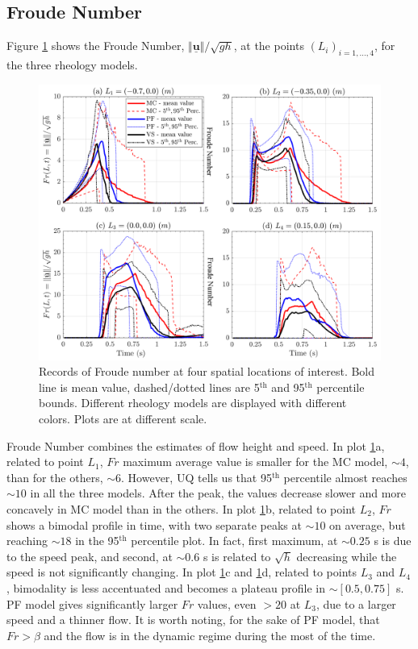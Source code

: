 \documentclass{article}
\begin{document}
\subsection{Froude Number}
Figure \ref{fig:Ramp-Fr} shows the Froude Number, $\Vert \underline{\mathbf{u}} \Vert/\sqrt{gh}$, at the points $(L_i)_{i=1,\dots,4}$, for the three rheology models.
\begin{figure}[H]
         \centering
        \includegraphics[width=1\textwidth]{InclinedPlane/LocalMeasurments/Froude.png}
        \caption{Records of Froude number at four spatial locations of interest. Bold line is mean value, dashed/dotted lines are 5$^{\mathrm{th}}$ and 95$^{\mathrm{th}}$ percentile bounds. Different rheology models are displayed with different colors. Plots are at different scale.}
        \label{fig:Ramp-Fr}
\end{figure}
Froude Number combines the estimates of flow height and speed. In plot \ref{fig:Ramp-Fr}a, related to point $L_1$, $Fr$ maximum average value is smaller for the MC model, $\sim 4$, than for the others, $\sim 6$. However, UQ tells us that 95$^{\mathrm{th}}$ percentile almost reaches $\sim 10$ in all the three models. After the peak, the values decrease slower and more concavely in MC model than in the others. In plot \ref{fig:Ramp-Fr}b, related to point $L_2$, $Fr$ shows a bimodal profile in time, with two separate peaks at $\sim 10$ on average, but reaching $\sim 18$ in the 95$^{\mathrm{th}}$ percentile plot. In fact, first maximum, at $\sim 0.25$ s is due to the speed peak, and second, at $\sim 0.6$ s is related to $\sqrt{h}$ decreasing while the speed is not significantly changing. In plot \ref{fig:Ramp-Fr}c and \ref{fig:Ramp-Fr}d, related to points $L_3$ and $L_4$, bimodality is less accentuated and becomes a plateau profile in $\sim [0.5, 0.75]$ s. PF model gives significantly larger $Fr$ values, even $>20$ at $L_3$, due to a larger speed and a thinner flow. It is worth noting, for the sake of PF model, that $Fr>\beta$ and the flow is in the dynamic regime during the most of the time.
\end{document}
